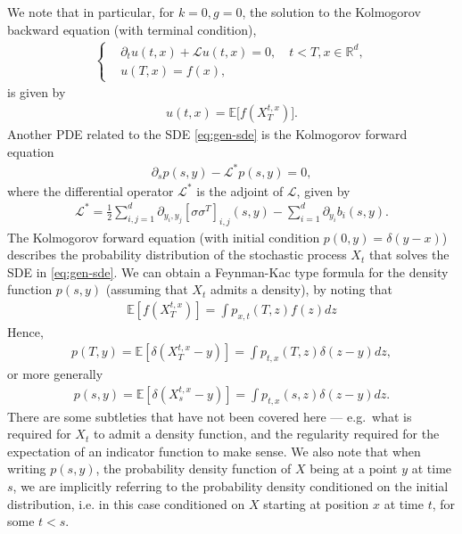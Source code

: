 \documentclass{article}  %
\begin{document}
We note that in particular, for $k=0,g=0$, the solution to the Kolmogorov backward equation (with terminal condition),
%
\begin{align}
    \label{eq:kolmogorov-backward}
    \begin{cases}
    &\partial_t u(t,x) + \mathcal{L}u(t,x) = 0, \quad t<T,x \in \mathbb{R}^d, \\
    &u(T,x) = f(x),
    \end{cases}
\end{align}
%
is given by 
%
\begin{align}
    u(t,x) = \mathbb{E}\big[ f(X_T^{t,x}) \big]. 
\end{align} 
% 
Another PDE related to the SDE \autoref{eq:gen-sde} is the Kolmogorov forward equation
%
\begin{align} %
    \label{eq:kolmogorov-forward}
    \partial_s p(s,y) - \mathcal{L}^{*}p(s,y) = 0,
\end{align}
%
where the differential operator $\mathcal{L}^{*}$ is the adjoint of $\mathcal{L}$, given by
%
\begin{align}
    \label{eq:adjoint-operator}
     \mathcal{L}^{*} = \frac{1}{2} \sum_{i,j=1}^{d} \partial_{y_i,y_j} [\sigma \sigma^T]_{i,j}(s,y) - \sum_{i=1}^{d} \partial_{y_i}b_i(s,y).
\end{align} 
%
The Kolmogorov forward equation (with initial condition $p(0,y)=\delta(y-x)$) describes the probability distribution of the stochastic process $X_t$ that solves the SDE in \autoref{eq:gen-sde}. We can obtain a Feynman-Kac type formula for the density function $p(s,y)$ (assuming that $X_t$ admits a density), by noting that
%
\begin{align} 
    \mathbb{E}[f(X_T^{t,x})] = \int p_{x,t}(T,z)f(z)dz 
\end{align}
%
Hence,
%
\begin{align}
    p(T,y) = \mathbb{E}[\delta({X_T^{t,x} - y})] = \int p_{t,x}(T,z)\delta({z-y})dz, 
\end{align} 
%
or more generally
%
\begin{align}
    p(s,y) = \mathbb{E}[\delta({X_s^{t,x} - y})] = \int p_{t,x}(s,z)\delta({z-y})dz.
\end{align} 
%
There are some subtleties that have not been covered here --- e.g.\ what is required for $X_t$ to admit a density function, and the regularity required for the expectation of an indicator function to make sense. We also note that when writing $p(s,y)$, the probability density function of $X$ being at a point $y$ at time $s$, we are implicitly referring to the probability density conditioned on the initial distribution, i.e. in this case conditioned on $X$ starting at position $x$ at time $t$, for some $t<s$.
\end{document}
